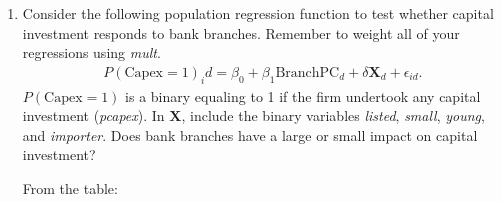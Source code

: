 \documentclass[11pt,twoside,openany]{memoir}
\begin{document}
\begin{question}
    \phantom{a}
    \begin{enumerate}[label = (\alph*),itemsep=1pt,topsep=3pt]
        \item Consider the following population regression function to test whether capital investment responds to bank branches. Remember to weight all of your regressions using \textit{mult}.
            \begin{equation*}
            \begin{split}
                P(\text{Capex} = 1)_id = \beta_0 + \beta_1\text{BranchPC}_d + \delta \mathbf{X}_d + \epsilon_{id}.
            \end{split}
            \end{equation*}
        $P(\text{Capex} = 1)$ is a binary equaling to 1 if the firm undertook any capital investment (\textit{pcapex}). In $\mathbf{X}$, include the binary variables \textit{listed}, \textit{small}, \textit{young}, and \textit{importer}. Does bank branches have a large or small impact on capital investment?
            {\color{blue} \begin{solution}
                From the table:


\end{solution}}
\end{enumerate}
\end{question}
\end{document}
